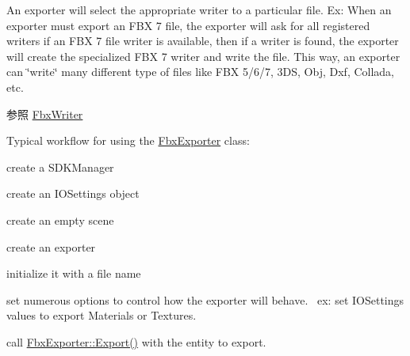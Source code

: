 An exporter will select the appropriate writer to a particular file. Ex\+: When an exporter must export an F\+BX 7 file, the exporter will ask for all registered writers if an F\+BX 7 file writer is available, then if a writer is found, the exporter will create the specialized F\+BX 7 writer and write the file. This way, an exporter can \char`\"{}write\char`\"{} many different type of files like F\+BX 5/6/7, 3\+DS, Obj, Dxf, Collada, etc. \begin{DoxySeeAlso}{参照}
\hyperlink{class_fbx_writer}{Fbx\+Writer}
\end{DoxySeeAlso}
Typical workflow for using the \hyperlink{class_fbx_exporter}{Fbx\+Exporter} class\+:
\begin{DoxyEnumerate}
\item create a S\+D\+K\+Manager
\item create an I\+O\+Settings object
\item create an empty scene
\item create an exporter
\item initialize it with a file name
\item set numerous options to control how the exporter will behave.~\newline
 ex\+: set I\+O\+Settings values to export Materials or Textures.
\item call \hyperlink{class_fbx_exporter_a8a92372cf76fe3486a798c87973cc791}{Fbx\+Exporter\+::\+Export()} with the entity to export.
\end{DoxyEnumerate}


